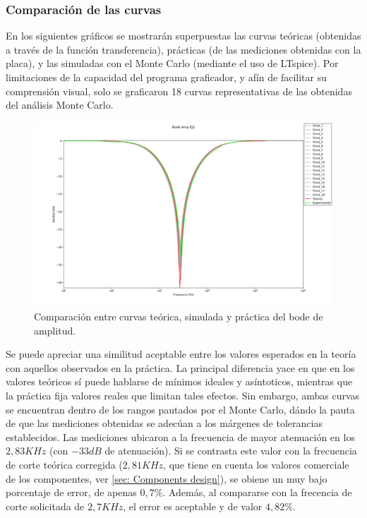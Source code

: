 



\subsubsection{Comparaci\'on de las curvas}
En los siguientes gráficos se mostrarán superpuestas las curvas teóricas (obtenidas a través de la función transferencia), prácticas (de las mediciones obtenidas con la placa), y las simuladas con el Monte Carlo (mediante el uso de LTspice).
Por limitaciones de la capacidad del programa graficador, y afín de facilitar su comprensión visual, solo se graficaron 18 curvas representativas de las obtenidas del análisis Monte Carlo.
\begin{figure}[H]
    \centering
    \begin{minipage}{\textwidth}
        \centering
        \includegraphics[width=\textwidth]{EJ1/Bode_Amp_EJ1.png}
        \caption{Comparaci\'on entre curvas teórica, simulada y práctica del bode de amplitud.}
        \label{fig: Amplitude Bode}
    \end{minipage}\hfill
\end{figure}
Se puede apreciar una similitud aceptable entre los valores esperados en la teoría con aquellos observados en la práctica.
La principal diferencia yace en que en los valores teóricos sí puede hablarse de mínimos ideales y asíntoticos, mientras que la práctica fija valores reales que limitan tales efectos.
Sin embargo, ambas curvas se encuentran dentro de los rangos pautados por el Monte Carlo, dándo la pauta de que las mediciones obtenidas se adecúan a los márgenes de tolerancias establecidos.
Las mediciones ubicaron a la frecuencia de mayor atenuación en los $2,83 KHz$ (con $-33dB$ de atenuación).
Si se contrasta este valor con la frecuencia de corte teórica corregida ($2,81 KHz$, que tiene en cuenta los valores comerciale de los componentes, ver \ref{sec: Components design}), se obiene un muy bajo porcentaje de error, de apenas $0,7\%$.
Además, al compararse con la frecencia de corte solicitada de $2,7 KHz$, el error es aceptable y de valor $4,82\%$.


